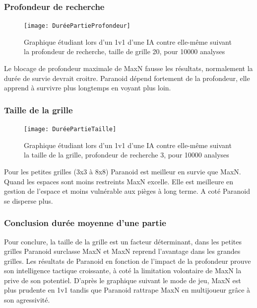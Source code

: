 \documentclass[a4paper,12pt]{article}
\begin{document}
\newpage

\subsubsection{Profondeur de recherche}
\begin{figure}[h!]
		\centering	\texttt{[image: DuréePartieProfondeur]}
		\caption{Graphique étudiant lors d'un 1v1 d'une IA contre elle-même suivant la profondeur de recherche, taille de grille 20, pour 10000 analyses}
		\end{figure}
Le blocage de profondeur maximale de MaxN fausse les résultats, normalement la durée de survie devrait croitre. Paranoid dépend fortement de la profondeur, elle apprend à survivre plus longtemps en voyant plus loin.

\subsubsection{Taille de la grille}
\begin{figure}[h!]
		\centering	\texttt{[image: DuréePartieTaille]}
		\caption{Graphique étudiant lors d'un 1v1 d'une IA contre elle-même suivant la taille de la grille, profondeur de recherche 3, pour 10000 analyses}
		\end{figure}
Pour les petites grilles (3x3 à 8x8) Paranoid est meilleur en survie que MaxN. Quand les espaces sont moins restreints MaxN excelle. Elle est meilleure en gestion de l'espace et moins vulnérable aux pièges à long terme. A coté Paranoid se disperse plus.

\newpage

\subsubsection{Conclusion durée moyenne d'une partie}
Pour conclure, la taille de la grille est un facteur déterminant, dans les petites grilles Paranoid surclasse MaxN et MaxN reprend l'avantage dans les grandes grilles.
Les résultats de Paranoid en fonction de l'impact de la profondeur prouve son intelligence tactique croissante, à coté la limitation volontaire de MaxN la prive de son potentiel.
D'après le graphique suivant le mode de jeu, MaxN est plus prudente en 1v1 tandis que Paranoid rattrape MaxN en multijoueur grâce à son agressivité.
\end{document}
